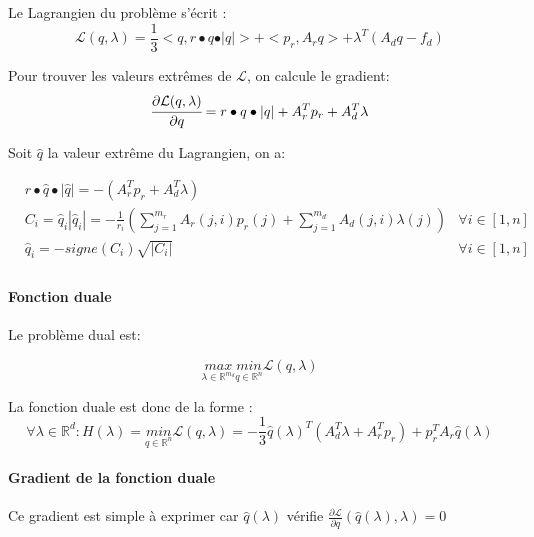 Le Lagrangien du problème s'écrit :
\begin{equation}
\mathcal{L}(q, \lambda) = \frac{1}{3} <q, r\bullet q\bullet \vert q\vert> + <p_r, A_rq> + \lambda^T(A_dq - f_d)
\end{equation}

Pour trouver les valeurs extrêmes de $\mathcal{L}$, on calcule le gradient:
\begin{equation}
  \cfrac{\partial \mathcal{L} (q, \lambda)}{\partial q} = r\bullet q \bullet |q| + A_r^T p_r + A_d^T \lambda
\end{equation}

Soit $\hat{q}$ la valeur extrême du Lagrangien, on a:

\begin{align}
  &r\bullet \hat{q} \bullet |\hat{q}| =  -( A_r^T p_r + A_d^T \lambda)\\
  &C_i = \hat{q}_i |\hat{q}_i| = - \frac{1}{r_i} (\sum_{j=1}^{m_r} A_r(j,i) p_r(j) + \sum_{j=1}^{m_d} A_d(j, i) \lambda(j)) &\forall i \in [1,n]\\
  &\hat{q}_i = -signe(C_i)\sqrt{|C_i|} &\forall i \in [1,n]\\
\end{align}

\paragraph{Fonction duale}

Le problème dual est:

\begin{equation}
  \underset{\lambda \in \mathbb{R}^{m_d}}{max} \underset{q\in \mathbb{R}^n}{min}  \mathcal{L} (q, \lambda)
\end{equation}

La fonction duale est donc de la forme : 
\begin{equation}
\forall \lambda \in \mathbb{R}^d  : H(\lambda) = \underset{q\in \mathbb{R}^n}{min} \mathcal{L} (q, \lambda) = - \frac{1}{3} \hat{q}(\lambda)^T(A_d^T\lambda + A_r^Tp_r) + p_r^TA_r\hat{q}(\lambda)
\end{equation}


\paragraph{Gradient de la fonction duale}
Ce gradient est simple à exprimer car $\hat{q}(\lambda)$ vérifie $\frac{\partial \mathcal{L}}{\partial{q}}(\hat{q}(\lambda), \lambda) = 0$


